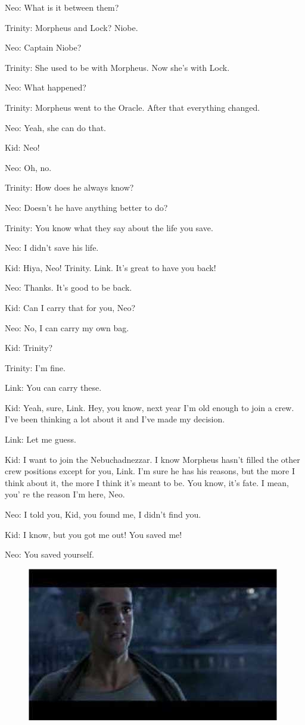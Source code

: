 \documentclass[UTF8]{ctexart}
\newenvironment{myquote}{\color{green} \setlength{\leftskip}{6em} \setlength{\rightskip}{4em} \setlength{\parindent}{-2em}}{\par}
\begin{document}
\begin{myquote}
Neo: What is it between them?

Trinity: Morpheus and Lock? Niobe.

Neo: Captain Niobe?

Trinity: She used to be with Morpheus. Now she's with Lock.

Neo: What happened?

Trinity: Morpheus went to the Oracle. After that everything changed.

Neo: Yeah, she can do that.

Kid: Neo!

Neo: Oh, no.

Trinity: How does he always know?

Neo: Doesn't he have anything better to do?

Trinity: You know what they say about the life you save.

Neo: I didn't save his life.

Kid: Hiya, Neo! Trinity. Link. It's great to have you back!

Neo: Thanks. It's good to be back.

Kid: Can I carry that for you, Neo?

Neo: No, I can carry my own bag.

Kid: Trinity?

Trinity: I'm fine.

Link: You can carry these.

Kid: Yeah, sure, Link. Hey, you know, next year I'm old enough to join a crew. I've been thinking a lot about it and I've made my decision.

Link: Let me guess.

Kid: I want to join the Nebuchadnezzar. I know Morpheus hasn't filled the other crew positions except for you, Link. I'm sure he has his reasons, but the more I think about it, the more I think it's meant to be. You know, it's fate. I mean, you' re the reason I'm here, Neo.

Neo: I told you, Kid, you found me, I didn't find you.

Kid: I know, but you got me out! You saved me!

Neo: You saved yourself.
\end{myquote}

\begin{figure}[htb]
\centering
\includegraphics[width=0.5\linewidth]{fig/read_reloaded-35}
\end{figure}
\end{document}
